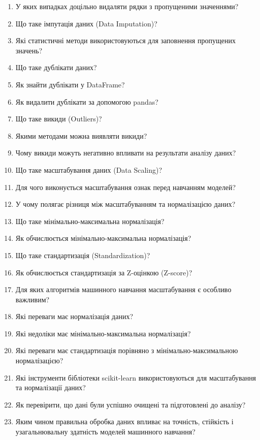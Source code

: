\begin{enumerate}
\item У яких випадках доцільно видаляти рядки з пропущеними значеннями?
\item Що таке імпутація даних (Data Imputation)?
\item Які статистичні методи використовуються для заповнення пропущених значень?
\item Що таке дублікати даних?
\item Як знайти дублікати у DataFrame?
\item Як видалити дублікати за допомогою pandas?
\item Що таке викиди (Outliers)?
\item Якими методами можна виявляти викиди?
\item Чому викиди можуть негативно впливати на результати аналізу даних?
\item Що таке масштабування даних (Data Scaling)?
\item Для чого виконується масштабування ознак перед навчанням моделей?
\item У чому полягає різниця між масштабуванням та нормалізацією даних?
\item Що таке мінімально-максимальна нормалізація?
\item Як обчислюється мінімально-максимальна нормалізація?
\item Що таке стандартизація (Standardization)?
\item Як обчислюється стандартизація за Z-оцінкою (Z-score)?
\item Для яких алгоритмів машинного навчання масштабування є особливо важливим?
\item Які переваги має нормалізація даних?
\item Які недоліки має мінімально-максимальна нормалізація?
\item Які переваги має стандартизація порівняно з мінімально-максимальною нормалізацією?
\item Які інструменти бібліотеки scikit-learn використовуються для масштабування та нормалізації даних?
\item Як перевірити, що дані були успішно очищені та підготовлені до аналізу?
\item Яким чином правильна обробка даних впливає на точність, стійкість і узагальнювальну здатність моделей машинного навчання?
\end{enumerate}



